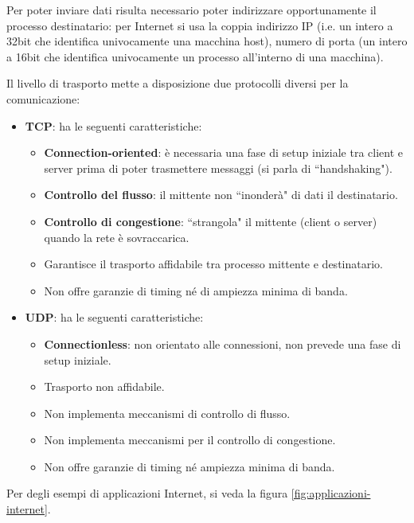 \documentclass[11pt, italian, openany]{book}
\begin{document}
\begin{sloppypar}
Per poter inviare dati risulta necessario poter indirizzare opportunamente il processo destinatario: per Internet si usa la coppia indirizzo IP (i.e. un
intero a 32bit che identifica univocamente una macchina host), numero di porta (un intero a 16bit che identifica univocamente un processo all'interno di
una macchina).

Il livello di trasporto mette a disposizione due protocolli diversi per la comunicazione:
\begin{itemize}[topsep=0pt, itemsep=0pt, parsep=0pt]
	\item \textbf{TCP}: ha le seguenti caratteristiche:
	\begin{itemize}[topsep=0pt, itemsep=0pt, parsep=0pt]
		\item \textbf{Connection-oriented}: \`e necessaria una fase di setup iniziale tra client e server prima di poter trasmettere messaggi (si parla
		di ``handshaking").
		\item \textbf{Controllo del flusso}: il mittente non ``inonder\`a" di dati il destinatario.
		\item \textbf{Controllo di congestione}: ``strangola" il mittente (client o server) quando la rete \`e sovraccarica.
		\item Garantisce il trasporto affidabile tra processo mittente e destinatario.
		\item Non offre garanzie di timing n\'e di ampiezza minima di banda.
	\end{itemize}
	\item \textbf{UDP}: ha le seguenti caratteristiche:
	\begin{itemize}[topsep=0pt, itemsep=0pt, parsep=0pt]
		\item \textbf{Connectionless}: non orientato alle connessioni, non prevede una fase di setup iniziale.
		\item Trasporto non affidabile.
		\item Non implementa meccanismi di controllo di flusso.
		\item Non implementa meccanismi per il controllo di congestione.
		\item Non offre garanzie di timing n\'e ampiezza minima di banda.
	\end{itemize}
\end{itemize}

Per degli esempi di applicazioni Internet, si veda la figura \ref{fig:applicazioni-internet}.


\end{sloppypar}
\end{document}
